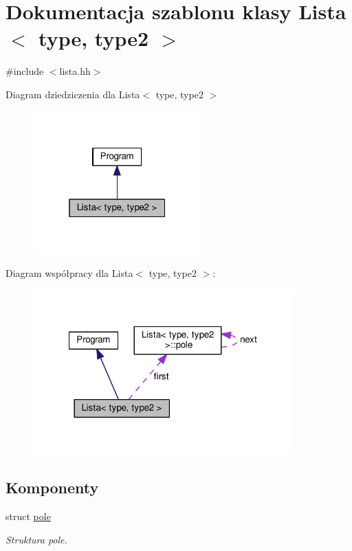 \hypertarget{class_lista}{\section{Dokumentacja szablonu klasy Lista$<$ type, type2 $>$}
\label{class_lista}
}


{\ttfamily \#include $<$lista.\-hh$>$}



Diagram dziedziczenia dla Lista$<$ type, type2 $>$
\nopagebreak
\begin{figure}[H]
\begin{center}
\leavevmode
\includegraphics[width=184pt]{class_lista__inherit__graph}
\end{center}
\end{figure}


Diagram współpracy dla Lista$<$ type, type2 $>$\-:
\nopagebreak
\begin{figure}[H]
\begin{center}
\leavevmode
\includegraphics[width=285pt]{class_lista__coll__graph}
\end{center}
\end{figure}
\subsection*{Komponenty}
\begin{DoxyCompactItemize}
\item 
struct \hyperlink{struct_lista_1_1pole}{pole}
\begin{DoxyCompactList}\small\item\em Struktura pole. \end{DoxyCompactList}\end{DoxyCompactItemize}
